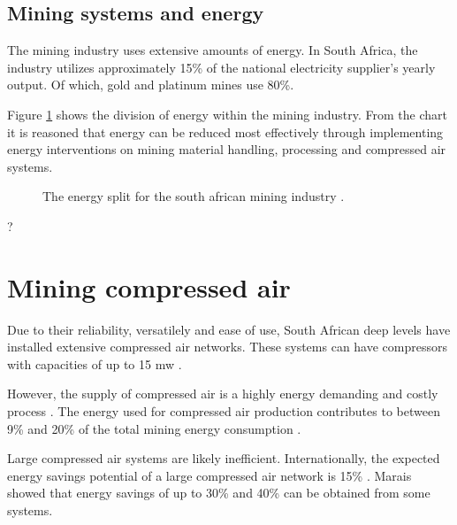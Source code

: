 \subsection{Mining systems and energy}
The mining industry uses extensive amounts of energy. In South Africa, the industry utilizes approximately 15\% of the national electricity supplier's yearly output. Of which, gold and platinum mines use 80\%.\cite{Eskom2010Energy}\par
Figure \ref{fig: Energy Split} shows the division of energy within the mining industry. From the chart it is reasoned that energy can be reduced most effectively through implementing energy interventions on mining material handling, processing and compressed air systems.
\begin{figure}[h]
	\centering
	\caption[The energy split for the south african mining industry.]{The energy split for the south african mining industry \cite{Eskom2010Energy}.}
	\label{fig: Energy Split}
\end{figure}
\par
?%
\section{Mining compressed air}
Due to their reliability, versatilely and ease of use, South African deep levels have installed extensive compressed air networks. These systems can have compressors with capacities of up to 15 \gls{mw} \cite{Marais2012PhD}.\par
However, the supply of compressed air is a highly energy demanding and costly process \cite{padachi2009energy}.  The energy used for compressed air production contributes to between 9\% and 20\% of the total mining energy consumption \cite{Eskom2010Energy,du2011development}. \par
Large compressed air systems are likely inefficient. Internationally, the expected energy savings potential of a large compressed air network is 15\% \cite{neale2009compressed}. Marais \cite{marais2013simplification} showed that energy savings of up to 30\% and 40\% can be obtained from some systems. 
